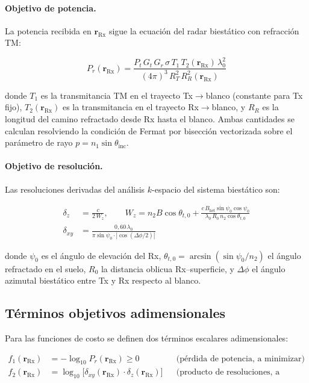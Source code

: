 \documentclass[11pt, a4paper]{article}
\newcommand{\Rx}{\mathrm{Rx}}
\newcommand{\rRx}{\mathbf{r}_{\Rx}}
\newcommand{\dxy}{\delta_{xy}}
\newcommand{\dz}{\delta_z}
\begin{document}
\paragraph{Objetivo de potencia.}
La potencia recibida en $\rRx$ sigue la ecuación del radar biestático con
refracción TM:

\begin{equation}
  P_r(\rRx) = \frac{P_t \, G_t \, G_r \, \sigma \, T_1 \, T_2(\rRx) \, \lambda_0^2}
                   {(4\pi)^3 \, R_T^2 \, R_R^2(\rRx)}
  \label{eq:Pr}
\end{equation}

donde $T_1$ es la transmitancia TM en el trayecto Tx$\to$blanco (constante para Tx fijo),
$T_2(\rRx)$ es la transmitancia en el trayecto Rx$\to$blanco, y $R_R$ es la longitud
del camino refractado desde Rx hasta el blanco. Ambas cantidades se calculan resolviendo
la condición de Fermat por bisección vectorizada sobre el parámetro de rayo
$p = n_1\sin\theta_{\mathrm{inc}}$.

\paragraph{Objetivo de resolución.}
Las resoluciones derivadas del análisis $k$-espacio del sistema biestático son:

\begin{align}
  \dz &= \frac{c}{2\,W_z}, \qquad
  W_z = n_2 B \cos\theta_{t,0}
        + \frac{c \, B_\mathrm{hel} \sin\psi_0 \cos\psi_0}
               {\lambda_0 \, R_0 \, n_2 \cos\theta_{t,0}}
  \label{eq:dz} \\[6pt]
  \dxy &= \frac{0{,}60\,\lambda_0}{\pi \sin\psi_0 \cdot |\cos(\Delta\phi/2)|}
  \label{eq:dxy}
\end{align}

donde $\psi_0$ es el ángulo de elevación del Rx,
$\theta_{t,0} = \arcsin(\sin\psi_0/n_2)$ el ángulo refractado en el suelo,
$R_0$ la distancia oblicua Rx–superficie, y $\Delta\phi$ el ángulo azimutal
biestático entre Tx y Rx respecto al blanco.

\subsection{Términos objetivos adimensionales}

Para las funciones de costo se definen dos términos escalares adimensionales:

\begin{align}
  f_1(\rRx) &= -\log_{10} P_r(\rRx) \geq 0
  && \text{(pérdida de potencia, a minimizar)}
  \label{eq:f1} \\
  f_2(\rRx) &= \log_{10}\!\bigl[\dxy(\rRx)\cdot\dz(\rRx)\bigr]
  && \text{(producto de resoluciones, a minimizar)}
  \label{eq:f2}
\end{align}
\end{document}

